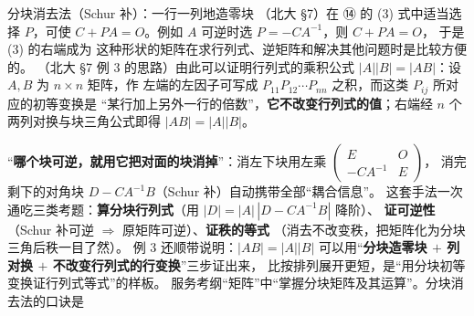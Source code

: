 \begin{fdeep}{分块消去法（Schur 补）：一行一列地造零块}
（北大 §7）在 ⑭ 的 (3) 式中适当选择 $P$，可使 $C+PA=O$。例如 $A$ 可逆时选 $P=-CA^{-1}$，则 $C+PA=O$，
于是 (3) 的右端成为
这种形状的矩阵在求行列式、逆矩阵和解决其他问题时是比较方便的。
（北大 §7 例 3 的思路）由此可以证明行列式的乘积公式 $|A||B|=|AB|$：设 $A,B$ 为 $n\times n$ 矩阵，作
左端的左因子可写成 $P_{11}P_{12}\cdots P_{nn}$ 之积，而这类 $P_{ij}$ 所对应的初等变换是
“某行加上另外一行的倍数”，\textbf{它不改变行列式的值}；右端经 $n$ 个两列对换与块三角公式即得 $|AB|=|A||B|$。

“\textbf{哪个块可逆，就用它把对面的块消掉}”：消左下块用左乘 $\begin{pmatrix}E&O\\-CA^{-1}&E\end{pmatrix}$，
消完剩下的对角块 $D-CA^{-1}B$（Schur 补）自动携带全部“耦合信息”。
这套手法一次通吃三类考题：\textbf{算分块行列式}（用 $|D|=|A|\,|D-CA^{-1}B|$ 降阶）、
\textbf{证可逆性}（Schur 补可逆 $\Rightarrow$ 原矩阵可逆）、\textbf{证秩的等式}
（消去不改变秩，把矩阵化为分块三角后秩一目了然）。
例 3 还顺带说明：$|AB|=|A||B|$ 可以用“\textbf{分块造零块 $+$ 列对换 $+$ 不改变行列式的行变换}”三步证出来，
比按排列展开更短，是“用分块初等变换证行列式等式”的样板。
\fbref{}服务考纲“矩阵”中“掌握分块矩阵及其运算”。分块消去法的口诀是
\end{fdeep}


